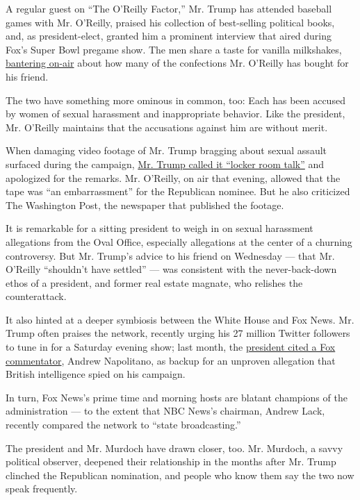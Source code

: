 A regular guest on ``The O'Reilly Factor,'' Mr. Trump has attended
baseball games with Mr. O'Reilly, praised his collection of best-selling
political books, and, as president-elect, granted him a prominent
interview that aired during Fox's Super Bowl pregame show. The men share
a taste for vanilla milkshakes,
\href{https://www.washingtonpost.com/blogs/erik-wemple/wp/2016/02/24/fox-newss-bill-oreilly-omits-vanilla-milkshake-disclosure-from-rant-on-media-trump/?utm_term=.0c0e688ee738}{bantering
on-air} about how many of the confections Mr. O'Reilly has bought for
his friend.

The two have something more ominous in common, too: Each has been
accused by women of sexual harassment and inappropriate behavior. Like
the president, Mr. O'Reilly maintains that the accusations against him
are without merit.

When damaging video footage of Mr. Trump bragging about sexual assault
surfaced during the campaign,
\href{https://www.nytimes3xbfgragh.onion/2016/10/08/us/politics/donald-trump-women.html}{Mr.
Trump called it ``locker room talk''} and apologized for the remarks.
Mr. O'Reilly, on air that evening, allowed that the tape was ``an
embarrassment'' for the Republican nominee. But he also criticized The
Washington Post, the newspaper that published the footage.

It is remarkable for a sitting president to weigh in on sexual
harassment allegations from the Oval Office, especially allegations at
the center of a churning controversy. But Mr. Trump's advice to his
friend on Wednesday --- that Mr. O'Reilly ``shouldn't have settled'' ---
was consistent with the never-back-down ethos of a president, and former
real estate magnate, who relishes the counterattack.

It also hinted at a deeper symbiosis between the White House and Fox
News. Mr. Trump often praises the network, recently urging his 27
million Twitter followers to tune in for a Saturday evening show; last
month, the
\href{https://www.nytimes3xbfgragh.onion/2017/03/17/business/media/fox-andrew-napolitano-trump.html}{president
cited a Fox commentator}, Andrew Napolitano, as backup for an unproven
allegation that British intelligence spied on his campaign.

In turn, Fox News's prime time and morning hosts are blatant champions
of the administration --- to the extent that NBC News's chairman, Andrew
Lack, recently compared the network to ``state broadcasting.''

The president and Mr. Murdoch have drawn closer, too. Mr. Murdoch, a
savvy political observer, deepened their relationship in the months
after Mr. Trump clinched the Republican nomination, and people who know
them say the two now speak frequently.

